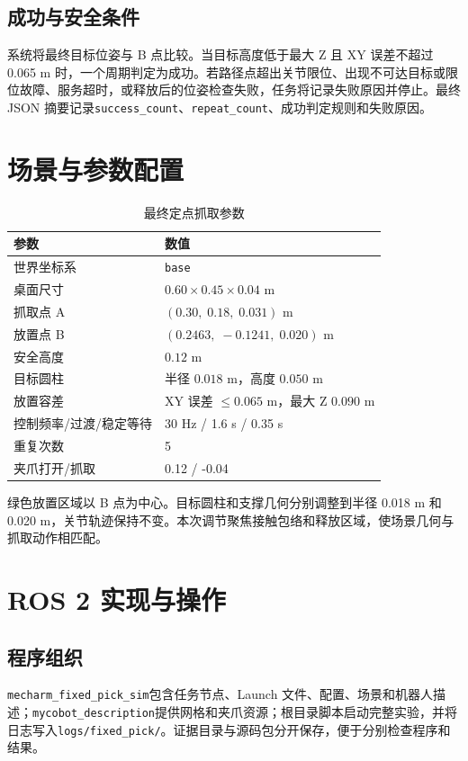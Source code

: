 \documentclass[UTF8,11pt,a4paper]{ctexart}
\newcommand{\code}[1]{\texttt{\footnotesize #1}}\newcommand{\resultbox}[1]{\begin{center}\fcolorbox{Navy}{Sky}{\parbox{0.93\textwidth}{\small #1}}\end{center}}
\begin{document}
\subsection{成功与安全条件}
系统将最终目标位姿与 B 点比较。当目标高度低于最大 Z 且 XY 误差不超过 0.065 m 时，一个周期判定为成功。若路径点超出关节限位、出现不可达目标或限位故障、服务超时，或释放后的位姿检查失败，任务将记录失败原因并停止。最终 JSON 摘要记录\code{success\_count}、\code{repeat\_count}、成功判定规则和失败原因。

\section{场景与参数配置}
\begin{table}[H]\centering\small\caption{最终定点抓取参数}\begin{tabular}{ll}\toprule 参数 & 数值\\\midrule 世界坐标系 & \code{base}\\桌面尺寸 & $0.60\times0.45\times0.04$ m\\抓取点 A & $(0.30,\;0.18,\;0.031)$ m\\放置点 B & $(0.2463,\;-0.1241,\;0.020)$ m\\安全高度 & $0.12$ m\\目标圆柱 & 半径 $0.018$ m，高度 $0.050$ m\\放置容差 & XY 误差 $\leq0.065$ m，最大 Z $0.090$ m\\控制频率/过渡/稳定等待 & 30 Hz / 1.6 s / 0.35 s\\重复次数 & 5\\夹爪打开/抓取 & 0.12 / -0.04\\\bottomrule\end{tabular}\end{table}
绿色放置区域以 B 点为中心。目标圆柱和支撑几何分别调整到半径 0.018 m 和 0.020 m，关节轨迹保持不变。本次调节聚焦接触包络和释放区域，使场景几何与抓取动作相匹配。

\section{ROS 2 实现与操作}
\subsection{程序组织}
\code{mecharm\_fixed\_pick\_sim}包含任务节点、Launch 文件、配置、场景和机器人描述；\code{mycobot\_description}提供网格和夹爪资源；根目录脚本启动完整实验，并将日志写入\code{logs/fixed\_pick/}。证据目录与源码包分开保存，便于分别检查程序和结果。
\end{document}

